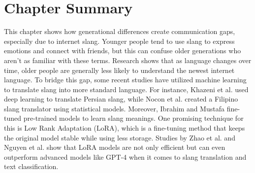 \section{Chapter Summary}
This chapter shows how generational differences create communication gaps, especially due to internet slang.
Younger people tend to use slang to express emotions and connect with friends, but this can confuse older generations who aren't as familiar with these terms.
Research shows that as language changes over time, older people are generally less likely to understand the newest internet language.
To bridge this gap, some recent studies have utilized machine learning to translate slang into more standard language.
For instance, Khazeni et al. \cite{Khazeni} used deep learning to translate Persian slang, while Nocon et al. \cite{Nocon_Kho_Arroyo_2018} created a Filipino slang translator using statistical models.
Moreover, Ibrahim and Mustafa \cite{Abdulstar_Ibrahim_Shareef_Mustafa_2023} fine-tuned pre-trained models to learn slang meanings.
One promising technique for this is Low Rank Adaptation (LoRA), which is a fine-tuning method that keeps the original model stable while using less storage.
Studies by Zhao et al. \cite{zhao2024loraland310finetuned} and Nguyen et al. \cite{nguyen2023finetuningllama2large} show that LoRA models are not only efficient but can even outperform advanced models like GPT-4 when it comes to slang translation and text classification. 
